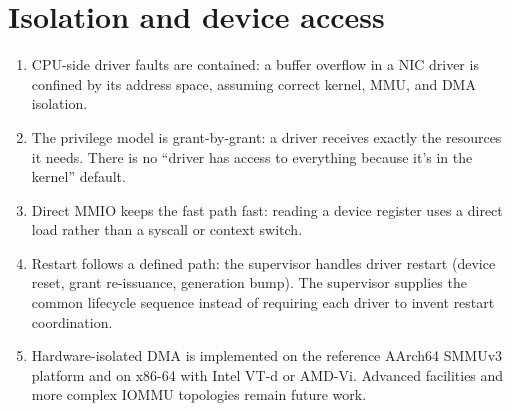 \section{Isolation and device access}

\begin{enumerate}
    \item CPU-side driver faults are contained: a buffer overflow in a
        NIC driver is confined by its address space, assuming correct kernel,
        MMU, and DMA isolation.

    \item The privilege model is grant-by-grant: a driver receives
        exactly the resources it needs. There is no ``driver has access to
        everything because it's in the kernel'' default.

    \item Direct MMIO keeps the fast path fast: reading a device
        register uses a direct load rather than a syscall or context switch.

    \item Restart follows a defined path: the supervisor handles
        driver restart (device reset, grant re-issuance, generation bump).
        The supervisor supplies the common lifecycle sequence instead of
        requiring each driver to invent restart coordination.

    \item Hardware-isolated DMA is implemented on the reference AArch64
        SMMUv3 platform and on x86-64 with Intel VT-d or AMD-Vi. Advanced
        facilities and more complex IOMMU topologies remain future work.
\end{enumerate}

\endinput
